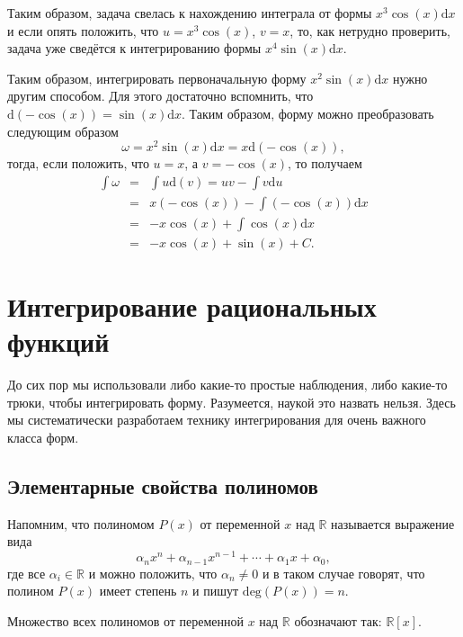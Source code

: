 \begin{example}
\begin{enumerate}
Таким образом, задача свелась к нахождению интеграла от формы $x^3 \cos(x)\mathrm{d}x$ и если опять положить, что $u= x^3 \cos(x)$, $v = x$, то, как нетрудно проверить, задача уже сведётся к интегрированию формы $x^4 \sin(x)\mathrm{d}x.$

Таким образом, интегрировать первоначальную форму $x^2 \sin(x) \mathrm{d}x$ нужно другим способом. Для этого достаточно вспомнить, что $\mathrm{d}(-\cos(x)) = \sin(x) \mathrm{d}x$. Таким образом, форму можно преобразовать следующим образом
\[
 \omega = x^2 \sin(x) \mathrm{d}x = x \mathrm{d}(-\cos (x)),
\]
тогда, если положить, что $u = x$, а $v = - \cos(x)$, то получаем
 \begin{eqnarray*}
     \int \omega &=& \int u \mathrm{d}(v) = uv - \int v \mathrm{d}u \\
     &=& x (- \cos(x)) - \int (-\cos(x))\mathrm{d}x \\
     &=& - x \cos(x) + \int \cos(x) \mathrm{d}x \\
     &=& - x \cos(x) + \sin(x) +C.
 \end{eqnarray*}
    \end{enumerate}
\end{example}


\section{Интегрирование рациональных функций}

До сих пор мы использовали либо какие-то простые наблюдения, либо какие-то трюки, чтобы интегрировать форму. Разумеется, наукой это назвать нельзя. Здесь мы систематически разработаем технику интегрирования для очень важного класса форм.

\subsection{Элементарные свойства полиномов}

Напомним, что полиномом $P(x)$ от переменной $x$ над $\mathbb{R}$ называется выражение вида 
$$
\alpha_nx^n + \alpha_{n-1}x^{n-1} + \cdots + \alpha_1x + \alpha_0,
$$
где все $\alpha_i \in \mathbb{R}$ и можно положить, что $\alpha_n \ne 0$ и в таком случае говорят, что полином $P(x)$ имеет степень $n$ и пишут $\mathrm{deg}(P(x))= n.$

Множество всех полиномов от переменной $x$ над $\mathbb{R}$ обозначают так: $\mathbb{R}[x].$

